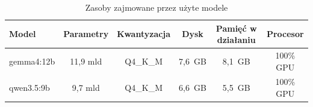 \begin{table}[H]
    \centering
    \caption{Zasoby zajmowane przez użyte modele}
    \label{tab:zasoby_modeli}
    \small
    \renewcommand{\arraystretch}{1.35}
    \begin{tabular}{|l|c|c|c|c|c|}
        \hline
        \rowcolor{gray!20}
        \textbf{Model} & \textbf{Parametry} & \textbf{Kwantyzacja} & \textbf{Dysk} & \textbf{Pamięć w działaniu} & \textbf{Procesor} \\ \hline
        gemma4:12b & 11,9 mld & Q4\_K\_M & 7,6~GB & 8,1~GB & 100\% GPU \\ \hline
        qwen3.5:9b & 9,7 mld & Q4\_K\_M & 6,6~GB & 5,5~GB & 100\% GPU \\ \hline
    \end{tabular}
\end{table}
